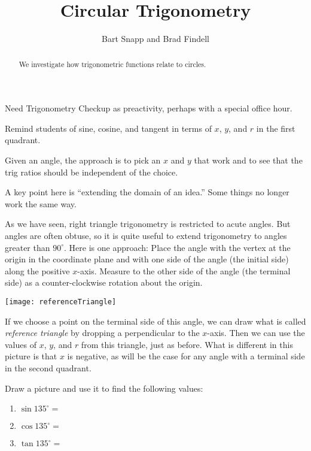 \documentclass[nooutcomes]{ximera}
\title{Circular Trigonometry}
\author{Bart Snapp and Brad Findell}
\begin{document}
\begin{abstract}
We investigate how trigonometric functions relate to circles.
\end{abstract}
\maketitle

\begin{teachingnote}
Need Trigonometry Checkup as preactivity, perhaps with a special office hour.  

Remind students of sine, cosine, and tangent in terms of $x$, $y$, and $r$ in the first quadrant.  

Given an angle, the approach is to pick an $x$ and $y$ that work and to see that the trig ratios should be independent of the choice.  

A key point here is ``extending the domain of an idea.''  Some things no longer work the same way.
\end{teachingnote}

As we have seen, right triangle trigonometry is restricted to acute angles.  But angles are often obtuse, so it is quite useful to extend trigonometry to angles greater than $90^\circ$.  Here is one approach:  Place the angle with the vertex at the origin in the coordinate plane and with one side of the angle (the initial side) along the positive $x$-axis.  
Measure to the other side of the angle (the terminal side) as a counter-clockwise rotation about the origin.   

\begin{image}
\texttt{[image: referenceTriangle]}
\end{image}

If we choose a point on the terminal side of this angle, we can draw what is called \emph{reference triangle} by dropping a perpendicular to the $x$-axis.  Then we can use the values of $x$, $y$, and $r$ from this triangle, just as before.  What is different in this picture is that $x$ is negative, as will be the case for any angle with a terminal side in the second quadrant.  


\begin{problem}
Draw a picture and use it to find the following values: 
\begin{enumerate}
\item $\sin 135^\circ = $
\item $\cos 135^\circ =$
\item $\tan 135^\circ =$
\end{enumerate}
\end{problem}
\end{document}
